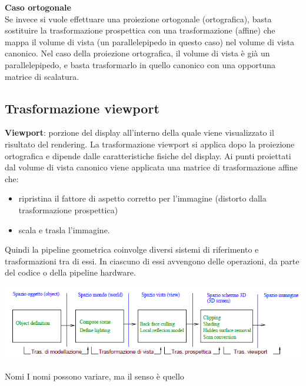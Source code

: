 \documentclass[a4paper, 10pt]{article}
\begin{document}
		\textbf{Caso ortogonale}\\
		Se invece si vuole effettuare una proiezione ortogonale (ortografica), basta sostituire la trasformazione prospettica con una trasformazione (affine) che mappa il volume di vista
		(un parallelepipedo in questo caso) nel volume di vista canonico. Nel caso della proiezione ortografica, il volume di vista è già un parallelepipedo, e basta trasformarlo in quello canonico con una opportuna matrice di scalatura.
	
	
	\subsection{Trasformazione viewport}
		\textbf{Viewport}: porzione del display all’interno della quale viene visualizzato il risultato del rendering. La trasformazione viewport si applica dopo la proiezione
		ortografica e dipende dalle caratteristiche fisiche del display. Ai punti proiettati dal volume di vista canonico viene applicata una matrice di trasformazione affine che: 
		\begin{itemize}
			\item ripristina il fattore di aspetto corretto per l’immagine (distorto dalla trasformazione prospettica)
			\item scala e trasla l’immagine.
		\end{itemize}
	
		Quindi la pipeline geometrica coinvolge diversi sistemi di riferimento e trasformazioni tra di essi. In ciascuno di essi avvengono delle operazioni, da parte del codice o della pipeline hardware.
		
		\begin{center}
			\includegraphics[scale=0.5]{pipelineg6}
		\end{center}
		
		Nomi
		I nomi possono variare, ma il senso è quello
	
\end{document}
